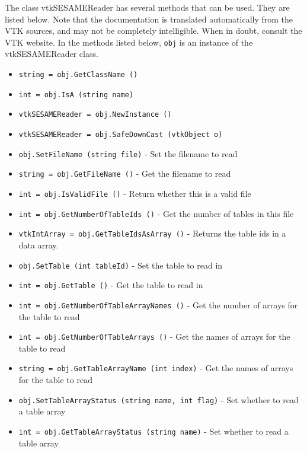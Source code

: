 The class vtkSESAMEReader has several methods that can be used.
  They are listed below.
Note that the documentation is translated automatically from the VTK sources,
and may not be completely intelligible.  When in doubt, consult the VTK website.
In the methods listed below, \verb|obj| is an instance of the vtkSESAMEReader class.
\begin{itemize}
\item  \verb|string = obj.GetClassName ()|

\item  \verb|int = obj.IsA (string name)|

\item  \verb|vtkSESAMEReader = obj.NewInstance ()|

\item  \verb|vtkSESAMEReader = obj.SafeDownCast (vtkObject o)|

\item  \verb|obj.SetFileName (string file)| -  Set the filename to read

\item  \verb|string = obj.GetFileName ()| -  Get the filename to read

\item  \verb|int = obj.IsValidFile ()| -  Return whether this is a valid file

\item  \verb|int = obj.GetNumberOfTableIds ()| -  Get the number of tables in this file

\item  \verb|vtkIntArray = obj.GetTableIdsAsArray ()| -  Returns the table ids in a data array.

\item  \verb|obj.SetTable (int tableId)| -  Set the table to read in

\item  \verb|int = obj.GetTable ()| -  Get the table to read in

\item  \verb|int = obj.GetNumberOfTableArrayNames ()| -  Get the number of arrays for the table to read

\item  \verb|int = obj.GetNumberOfTableArrays ()| -  Get the names of arrays for the table to read

\item  \verb|string = obj.GetTableArrayName (int index)| -  Get the names of arrays for the table to read

\item  \verb|obj.SetTableArrayStatus (string name, int flag)| -  Set whether to read a table array

\item  \verb|int = obj.GetTableArrayStatus (string name)| -  Set whether to read a table array

\end{itemize}
